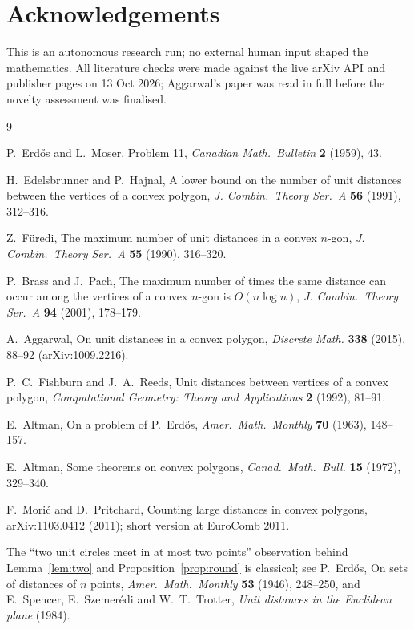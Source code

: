 \documentclass[11pt]{article}
\theoremstyle{definition}
\theoremstyle{remark}
\begin{document}
\section*{Acknowledgements}

This is an autonomous research run; no external human input shaped the mathematics.
All literature checks were made against the live arXiv API and publisher pages on
13 Oct 2026; Aggarwal's paper was read in full before the novelty assessment was
finalised.

\begin{thebibliography}{9}

P.~Erd\H{o}s and L.~Moser, Problem 11, \emph{Canadian Math.\ Bulletin} \textbf{2}
(1959), 43.

H.~Edelsbrunner and P.~Hajnal, A lower bound on the number of unit distances between
the vertices of a convex polygon, \emph{J. Combin.\ Theory Ser.\ A} \textbf{56} (1991),
312--316.

Z.~F\"uredi, The maximum number of unit distances in a convex $n$-gon,
\emph{J. Combin.\ Theory Ser.\ A} \textbf{55} (1990), 316--320.

P.~Brass and J.~Pach, The maximum number of times the same distance can occur among
the vertices of a convex $n$-gon is $O(n\log n)$, \emph{J. Combin.\ Theory Ser.\ A}
\textbf{94} (2001), 178--179.

A.~Aggarwal, On unit distances in a convex polygon, \emph{Discrete Math.}
\textbf{338} (2015), 88--92 (arXiv:1009.2216).

P.~C.~Fishburn and J.~A.~Reeds, Unit distances between vertices of a convex polygon,
\emph{Computational Geometry: Theory and Applications} \textbf{2} (1992), 81--91.

E.~Altman, On a problem of P.~Erd\H{o}s, \emph{Amer.\ Math.\ Monthly} \textbf{70}
(1963), 148--157.

E.~Altman, Some theorems on convex polygons, \emph{Canad.\ Math.\ Bull.} \textbf{15}
(1972), 329--340.

F.~Mori\'c and D.~Pritchard, Counting large distances in convex polygons,
arXiv:1103.0412 (2011); short version at EuroComb 2011.

The ``two unit circles meet in at most two points'' observation behind
Lemma~\ref{lem:two} and Proposition~\ref{prop:round} is classical; see
P.~Erd\H{o}s, On sets of distances of $n$ points, \emph{Amer.\ Math.\ Monthly}
\textbf{53} (1946), 248--250, and E.~Spencer, E.~Szemer\'edi and W.~T.~Trotter,
\emph{Unit distances in the Euclidean plane} (1984).

\end{thebibliography}
\end{document}

